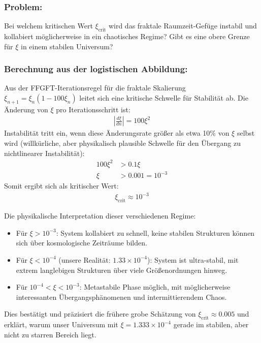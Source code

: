 	\subsubsection*{Problem:}
	Bei welchem kritischen Wert $\xi_{\text{crit}}$ wird das fraktale Raumzeit-Gefüge instabil und kollabiert möglicherweise in ein chaotisches Regime? Gibt es eine obere Grenze für $\xi$ in einem stabilen Universum?
	
	\subsubsection*{Berechnung aus der logistischen Abbildung:}
	
	Aus der FFGFT-Iterationsregel für die fraktale Skalierung $\xi_{n+1} = \xi_n (1 - 100\xi_n)$ leitet sich eine kritische Schwelle für Stabilität ab. Die Änderung von $\xi$ pro Iterationsschritt ist:
	\begin{align*}
		\left|\frac{d\xi}{dn}\right| = 100\xi^2
	\end{align*}
	Instabilität tritt ein, wenn diese Änderungsrate größer als etwa 10\% von $\xi$ selbst wird (willkürliche, aber physikalisch plausible Schwelle für den Übergang zu nichtlinearer Instabilität):
	\begin{align*}
		100\xi^2 &> 0.1\xi \\
		\xi &> 0.001 = 10^{-3}
	\end{align*}
	Somit ergibt sich als kritischer Wert:
	\begin{align*}
		\boxed{\xi_{\text{crit}} \approx 10^{-3}}
	\end{align*}
	
	Die physikalische Interpretation dieser verschiedenen Regime:
	\begin{itemize}
		\item Für $\xi > 10^{-3}$: System kollabiert zu schnell, keine stabilen Strukturen können sich über kosmologische Zeiträume bilden.
		\item Für $\xi < 10^{-4}$ (unsere Realität: $1.33\times10^{-4}$): System ist ultra-stabil, mit extrem langlebigen Strukturen über viele Größenordnungen hinweg.
		\item Für $10^{-4} < \xi < 10^{-3}$: Metastabile Phase möglich, mit möglicherweise interessanten Übergangsphänomenen und intermittierendem Chaos.
	\end{itemize}
	Dies bestätigt und präzisiert die frühere grobe Schätzung von $\xi_{\text{crit}} \approx 0.005$ und erklärt, warum unser Universum mit $\xi = 1.333\times10^{-4}$ gerade im stabilen, aber nicht zu starren Bereich liegt.
	
